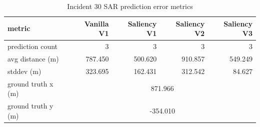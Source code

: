 \begin{table}[ht]
\centering
\caption{Incident 30 SAR prediction error metrics}
\label{tab:sar-incident-30}
\begin{tabular}{lrrrr}
\hline
metric & Vanilla V1 & Saliency V1 & Saliency V2 & Saliency V3 \\
\hline
prediction count & 3 & 3 & 3 & 3 \\
avg distance (m) & 787.450 & 500.620 & 910.857 & 549.249 \\
stddev (m) & 323.695 & 162.431 & 312.542 & 84.627 \\
ground truth x (m) & \multicolumn{4}{c}{871.966} \\
ground truth y (m) & \multicolumn{4}{c}{-354.010} \\
\hline
\end{tabular}
\end{table}
